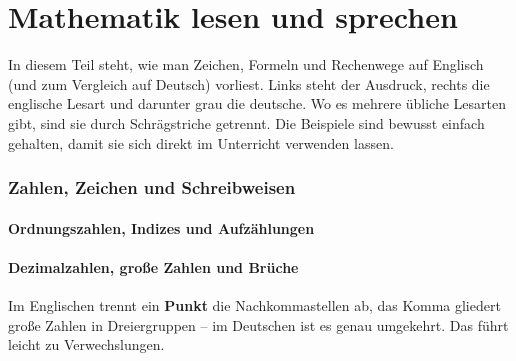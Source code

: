 \newpage
\part{Mathematik lesen und sprechen}

In diesem Teil steht, wie man Zeichen, Formeln und Rechenwege auf Englisch (und zum Vergleich auf
Deutsch) vorliest. Links steht der Ausdruck, rechts die englische Lesart und darunter grau die
deutsche. Wo es mehrere übliche Lesarten gibt, sind sie durch Schrägstriche getrennt. Die Beispiele
sind bewusst einfach gehalten, damit sie sich direkt im Unterricht verwenden lassen.

\section{Zahlen, Zeichen und Schreibweisen}

\subsection*{Ordnungszahlen, Indizes und Aufzählungen}

\begin{lesen}
\end{lesen}

\subsection*{Dezimalzahlen, große Zahlen und Brüche}

Im Englischen trennt ein \textbf{Punkt} die Nachkommastellen ab, das Komma gliedert große Zahlen in
Dreiergruppen -- im Deutschen ist es genau umgekehrt. Das führt leicht zu Verwechslungen.

